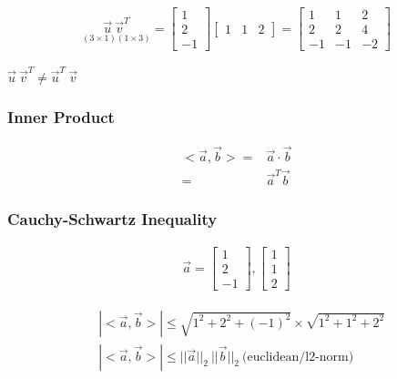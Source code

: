 \documentclass[11pt]{article}
\begin{document}
\begin{equation}
\begin{split}
\underset{(3 \times 1)(1 \times 3)}{\vec{u} \ \vec{v}^T} = \begin{bmatrix}
1\\
2\\
-1
\end{bmatrix}\begin{bmatrix}
1 & 1 & 2
\end{bmatrix} = \begin{bmatrix}
1 & 1 & 2\\
2 & 2 & 4\\
-1 & -1 & -2
\end{bmatrix}
\end{split}
\end{equation}

\(\vec{u} \ \vec{v}^T \neq \vec{u}^T \ \vec{v}\)

\subsubsection{Inner Product}
\label{sec:org41b1b99}

\begin{equation}
\begin{split}
<\vec{a}, \vec{b}> = & \vec{a} \cdot \vec{b}\\
= & \vec{a}^T \vec{b}
\end{split}
\end{equation}

\subsubsection{Cauchy-Schwartz Inequality}
\label{sec:orgb0b6da9}

\begin{equation}
\begin{split}
\vec{a} = \begin{bmatrix}
1\\
2\\
-1
\end{bmatrix}, \begin{bmatrix}
1\\
1\\
2
\end{bmatrix}
\end{split}
\end{equation}

\begin{equation}
\begin{split}
& |<\vec{a}, \vec{b}>| \leq \sqrt{1^2 + 2^2 + (-1)^2} \times \sqrt{1^2 + 1^2 + 2^2} \\
& |<\vec{a}, \vec{b}>| \leq ||\vec{a}||_2 \ ||\vec{b}||_2 \ \text{(euclidean/l2-norm)}
\end{split}
\end{equation}
\end{document}
